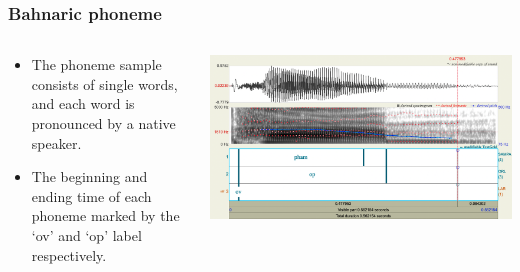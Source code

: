 \documentclass{beamer}
\begin{document}
\begin{frame}[allowframebreaks]
\frametitle{Bahnaric phoneme}
  \begin{columns}[T] %
    \begin{column}{.5\textwidth}
      \begin{itemize}
        \item The phoneme sample consists of single words, and each word is pronounced by a native speaker.
        \item The beginning and ending time of each phoneme marked by the `ov' and `op' label respectively.
      \end{itemize}
    \end{column}%
    \begin{column}{.5\textwidth}
      \begin{block}{}
      \includegraphics[width=\textwidth,height=\textheight,keepaspectratio]{img/phoneme_example.png}
      \end{block}
    \end{column}%
  \end{columns}
\end{frame}

\end{document}
